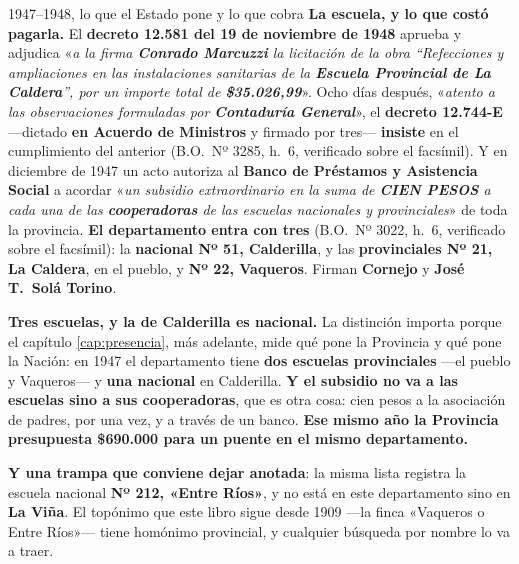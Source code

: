 \begin{ficha}{1947--1948, lo que el Estado pone y lo que cobra}
\textbf{La escuela, y lo que costó pagarla.} El \textbf{decreto 12.581 del 19 de noviembre
de 1948} aprueba y adjudica «\textit{a la firma \textbf{Conrado Marcuzzi} la licitación de la
obra ``Refecciones y ampliaciones en las instalaciones sanitarias de la \textbf{Escuela
Provincial de La Caldera}'', por un importe total de \textbf{\$35.026,99}}». Ocho días
después, «\textit{atento a las observaciones formuladas por \textbf{Contaduría General}}», el
\textbf{decreto 12.744-E} ---dictado \textbf{en Acuerdo de Ministros} y firmado por tres---
\textbf{insiste} en el cumplimiento del anterior (B.O.\ Nº 3285, h.\ 6, verificado sobre el
facsímil). Y en diciembre de 1947 un acto autoriza al \textbf{Banco de Préstamos y Asistencia Social} a acordar «\textit{un subsidio extraordinario en la suma de \textbf{CIEN PESOS} a cada una de las \textbf{cooperadoras} de las escuelas nacionales y provinciales}» de toda la provincia. \textbf{El departamento entra con tres} (B.O.\ Nº 3022, h.\ 6, verificado sobre el facsímil): la \textbf{nacional Nº 51, Calderilla}, y las \textbf{provinciales Nº 21, La Caldera}, en el pueblo, y \textbf{Nº 22, Vaqueros}. Firman \textbf{Cornejo} y \textbf{José T.\ Solá Torino}.

\textbf{Tres escuelas, y la de Calderilla es nacional.} La distinción importa porque el
capítulo \ref{cap:presencia}, más adelante, mide qué pone la Provincia y qué pone la Nación: en 1947 el
departamento tiene \textbf{dos escuelas provinciales} ---el pueblo y Vaqueros--- y
\textbf{una nacional} en Calderilla. \textbf{Y el subsidio no va a las escuelas sino a sus
cooperadoras}, que es otra cosa: cien pesos a la asociación de padres, por una vez, y a través
de un banco. \textbf{Ese mismo año la Provincia presupuesta \$690.000 para un puente en el
mismo departamento.}

\textbf{Y una trampa que conviene dejar anotada}: la misma lista registra la escuela nacional
\textbf{Nº 212, «Entre Ríos»}, y no está en este departamento sino en \textbf{La Viña}. El
topónimo que este libro sigue desde 1909 ---la finca «Vaqueros o Entre Ríos»--- tiene
homónimo provincial, y cualquier búsqueda por nombre lo va a traer.


\end{ficha}
